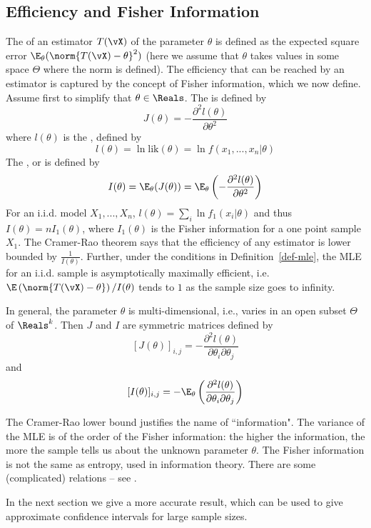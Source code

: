 \subsection{Efficiency and Fisher Information}
The  of an estimator $T(\vX)$ of the parameter
$\theta$ is defined as the expected square error
$\E_{\theta}(\norm{T(\vX)-\theta}^2)$ (here we assume that
$\theta$ takes values in some space $\Theta$ where the norm is
defined). The efficiency that can be reached by an estimator is
captured by the concept of Fisher information, which we now
define.
%
Assume first to simplify that $\theta \in \Reals$. The
 is defined by
$$
J(\theta)=-\frac{\partial^2 l(\theta)}{\partial \theta^2}
$$
where $l(\theta)$ is the , defined by
$$
l(\theta) = \ln \mbox{lik}(\theta) = \ln f(x_1,...,x_n|\theta)
$$
The , or  is
defined by
$$
I(\theta)
=\E_{\theta}(J(\theta))=\E_{\theta}\left(-\frac{\partial^2
l(\theta)}{\partial \theta^2}\right)
$$
For an i.i.d. model $X_1, ...,X_n$, $l(\theta)=\sum_i \ln
f_1(x_i|\theta)$ and thus $I(\theta)=n I_1(\theta)$, where
$I_1(\theta)$ is the Fisher information for a one point sample
$X_1$. The Cramer-Rao theorem says that the efficiency of any
 estimator is lower bounded by
$\frac{1}{I(\theta)}$. Further, under the conditions in
Definition~\ref{def-mle}, the MLE for an i.i.d. sample is
asymptotically maximally efficient, i.e.
$\E\left(\norm{T(\vX)-\theta}\right)/I(\theta)$ tends to $1$ as
the sample size goes to infinity.

In general, the parameter $\theta$ is multi-dimensional, i.e.,
varies in an open subset $\Theta$ of $\Reals^k$. Then $J$ and $I$
are symmetric matrices defined by
$$
[J(\theta)]_{i,j}=-\frac{\partial^2 l(\theta)}{\partial \theta_i
\partial \theta_j}
$$
and
$$
[I(\theta)]_{i,j}=-\E_{\theta}\left(\frac{\partial^2
l(\theta)}{\partial \theta_i \partial \theta_j}\right)
$$

The Cramer-Rao lower bound justifies the name of
``information". The variance of the MLE is of the order of the
Fisher information: the higher the information, the more the
sample tells us about the unknown parameter $\theta$. The
Fisher information is not the same as entropy, used in
information theory. There are some (complicated) relations --
see \cite[Chapter 16]{cover1991elements}.

In the next section we give a more accurate result, which can
be used to give approximate confidence intervals for large
sample sizes.

